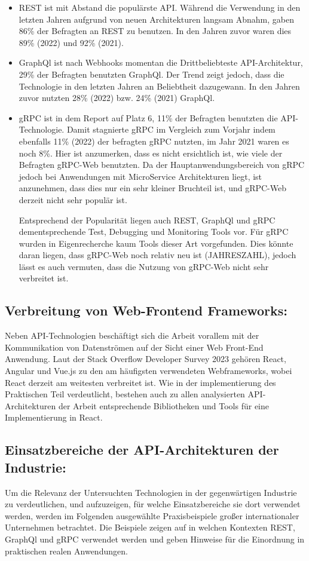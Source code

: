 \begin{itemize}
	\item REST ist mit Abstand die populärste API. Während die Verwendung in den letzten Jahren aufgrund von neuen Architekturen langsam Abnahm, gaben 86\% der Befragten an REST zu benutzen. In den Jahren zuvor waren dies 89\% (2022) und 92\% (2021).
	\item GraphQl ist nach Webhooks momentan die Drittbeliebteste API-Architektur, 29\% der Befragten benutzten GraphQl. Der Trend zeigt jedoch, dass die Technologie in den letzten Jahren an Beliebtheit dazugewann. In den Jahren zuvor nutzten 28\% (2022) bzw. 24\% (2021) GraphQl.
	\item gRPC ist in dem Report auf Platz 6, 11\% der Befragten benutzten die API-Technologie. Damit stagnierte gRPC im Vergleich zum Vorjahr indem ebenfalls 11\% (2022) der befragten gRPC nutzten, im Jahr 2021 waren es noch 8\%. Hier ist anzumerken, dass es nicht ersichtlich ist, wie viele der Befragten gRPC-Web benutzten. Da der Hauptanwendungsbereich von gRPC jedoch bei Anwendungen mit MicroService Architekturen liegt, ist anzunehmen, dass dies nur ein sehr kleiner Bruchteil ist, und gRPC-Web derzeit nicht sehr populär ist.
	
	
	Entsprechend der Popularität liegen auch REST, GraphQl und gRPC dementsprechende Test, Debugging und Monitoring Tools vor. Für gRPC wurden in Eigenrecherche kaum Tools dieser Art vorgefunden. Dies könnte daran liegen, dass gRPC-Web noch relativ neu ist (JAHRESZAHL), jedoch lässt es auch vermuten, dass die Nutzung von gRPC-Web nicht sehr verbreitet ist.
\end{itemize}

\subsection{Verbreitung von Web-Frontend Frameworks:}
Neben API-Technologien beschäftigt sich die Arbeit vorallem mit der Kommunikation von Datenströmen auf der Sicht einer Web Front-End Anwendung. Laut der Stack Overflow Developer Survey 2023 gehören React, Angular und Vue.js  zu den am häufigsten verwendeten Webframeworks, wobei React derzeit am weitesten verbreitet ist. Wie in der implementierung des Praktischen Teil verdeutlicht, bestehen auch zu allen analysierten API-Architekturen der Arbeit entsprechende Bibliotheken und Tools für eine Implementierung in React. 

\subsection{Einsatzbereiche der API-Architekturen der Industrie:}
Um die Relevanz der Untersuchten Technologien in der gegenwärtigen Industrie zu verdeutlichen, und aufzuzeigen, für welche Einsatzbereiche sie dort verwendet werden, werden im Folgenden ausgewählte Praxisbeispiele großer internationaler Unternehmen betrachtet. Die Beispiele zeigen auf in welchen Kontexten REST, GraphQl und gRPC verwendet werden und geben Hinweise für die Einordnung in praktischen realen Anwendungen.

